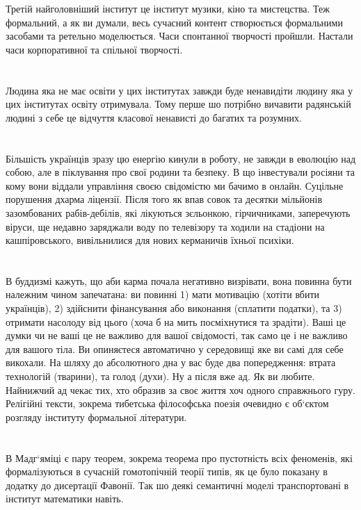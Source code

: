 Третій найголовніший інститут це інститут музики, кіно та мистецства. Теж формальний, а як ви думали, весь сучасний контент створюється формальними засобами та ретельно моделюється. Часи спонтанної творчості пройшли. Настали часи корпоративної та спільної творчості.\\
\\
\\
Людина яка не має освіти у цих інститутах завжди буде ненавидіти людину яка у цих інститутах освіту отримувала. Тому перше шо потрібно вичавити радянській людині з себе це відчуття класової ненависті до багатих та розумних.\\
\\
\\
Більшість українців зразу цю енергію кинули в роботу, не завжди в еволюцію над собою, але в піклування про свої родини та безпеку. В що інвестували росіяни та кому вони віддали управління своєю свідомістю ми бачимо в онлайн. Суцільне порушення дхарма ліцензії. Після того як впав совок та десятки мільйонів зазомбованих рабів-дебілів, які лікуються зєльонкою, гірчичниками, заперечують віруси, ще недавно заряджали воду по телевізору та ходили на стадіони на кашпіровського, вивільнилися для нових керманичів їхньої психіки.\\
\\
\\
В буддизмі кажуть, що аби карма почала негативно визрівати, вона повинна бути належним чином запечатана: ви повинні 1) мати мотивацію (хотіти вбити українців), 2) здійснити фінансування або виконання (сплатити податки), та 3) отримати насолоду від цього (хоча б на мить посміхнутися та зрадіти). Ваші це думки чи не ваші це не важливо для вашої свідомості, так само це і не важливо для вашого тіла. Ви опиняєтеся автоматично у середовищі яке ви самі для себе викохали. На шляху до абсолютного дна у вас буде два попередження: втрата технологій (тварини), та голод (духи). Ну а після вже ад. Як ви любите. Найнижчий ад чекає тих, хто образив за своє життя хоч одного справжнього гуру. Релігійні тексти, зокрема тибетська філософська поезія очевидно є об‘єктом розгляду інституту формальної літератури.\\
\\
\\
В Мадг‘яміці є пару теорем, зокрема теорема про пустотність всіх феноменів, які формалізуються в сучасній гомотопічній теорії типів, як це було показану в додатку до дисертації Фавонії. Так шо деякі семантичні моделі транспортовані в інститут математики навіть.\\
